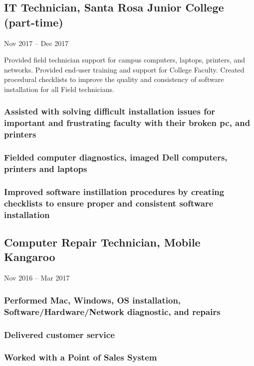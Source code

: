 \documentclass{article}
\begin{document}
    \subsection{IT Technician, Santa Rosa Junior College (part-time)} Nov 2017 – Dec 2017
        
        \vspace{0mm}
        Provided field technician support for campus computers, laptops, printers, and networks. Provided end-user training and support for College Faculty. Created procedural checklists to improve the quality and consistency of software installation for all Field technicians.

        \vspace{-2mm}
    	\subsubsection{Assisted with solving difficult installation issues for important and frustrating faculty with their broken pc, and printers }
    	\subsubsection{Fielded computer diagnostics, imaged Dell computers, printers and laptops }
    	\subsubsection{Improved software instillation procedures by creating checklists to ensure proper and consistent software installation}
    	
    \subsection{Computer Repair Technician, Mobile Kangaroo} Nov 2016 – Mar 2017
        
        \vspace{-2mm}
        \subsubsection{Performed Mac, Windows, OS installation, Software/Hardware/Network diagnostic, and repairs}
    	\subsubsection{Delivered customer service}
    	\subsubsection{Worked with a Point of Sales System}
\end{document}

